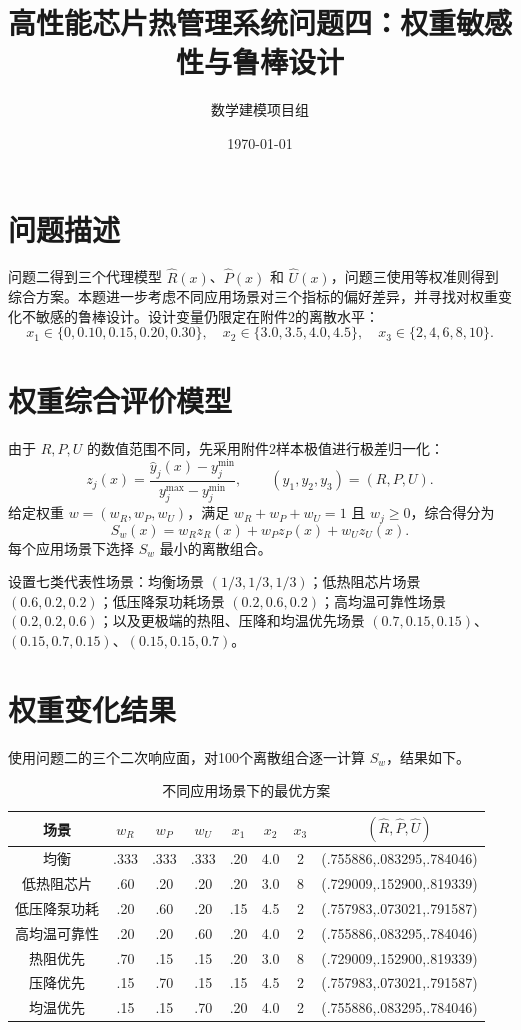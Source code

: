 \documentclass[UTF8,a4paper,12pt]{ctexart}
\title{高性能芯片热管理系统问题四：权重敏感性与鲁棒设计}
\author{数学建模项目组}\date{\today}
\begin{document}
\maketitle

\section{问题描述}
问题二得到三个代理模型 $\hat R(x)$、$\hat P(x)$ 和 $\hat U(x)$，问题三使用等权准则得到综合方案。本题进一步考虑不同应用场景对三个指标的偏好差异，并寻找对权重变化不敏感的鲁棒设计。设计变量仍限定在附件2的离散水平：
\[
x_1\in\{0,0.10,0.15,0.20,0.30\},\quad
x_2\in\{3.0,3.5,4.0,4.5\},\quad
x_3\in\{2,4,6,8,10\}.
\]

\section{权重综合评价模型}
由于 $R,P,U$ 的数值范围不同，先采用附件2样本极值进行极差归一化：
\begin{equation}
z_j(x)=\frac{\hat y_j(x)-y_j^{\min}}{y_j^{\max}-y_j^{\min}},\qquad (y_1,y_2,y_3)=(R,P,U).
\end{equation}
给定权重 $w=(w_R,w_P,w_U)$，满足 $w_R+w_P+w_U=1$ 且 $w_j\ge0$，综合得分为
\begin{equation}
S_w(x)=w_Rz_R(x)+w_Pz_P(x)+w_Uz_U(x).
\end{equation}
每个应用场景下选择 $S_w$ 最小的离散组合。

设置七类代表性场景：均衡场景 $(1/3,1/3,1/3)$；低热阻芯片场景 $(0.6,0.2,0.2)$；低压降泵功耗场景 $(0.2,0.6,0.2)$；高均温可靠性场景 $(0.2,0.2,0.6)$；以及更极端的热阻、压降和均温优先场景 $(0.7,0.15,0.15)$、$(0.15,0.7,0.15)$、$(0.15,0.15,0.7)$。

\section{权重变化结果}
使用问题二的三个二次响应面，对100个离散组合逐一计算 $S_w$，结果如下。

\begin{table}[h]\centering\caption{不同应用场景下的最优方案}
\begin{tabular}{c|ccc|ccc|c}
\toprule
场景 & $w_R$ & $w_P$ & $w_U$ & $x_1$ & $x_2$ & $x_3$ & $(\hat R,\hat P,\hat U)$\\
\midrule
均衡 & .333 & .333 & .333 & .20 & 4.0 & 2 & (.755886,.083295,.784046)\\
低热阻芯片 & .60 & .20 & .20 & .20 & 3.0 & 8 & (.729009,.152900,.819339)\\
低压降泵功耗 & .20 & .60 & .20 & .15 & 4.5 & 2 & (.757983,.073021,.791587)\\
高均温可靠性 & .20 & .20 & .60 & .20 & 4.0 & 2 & (.755886,.083295,.784046)\\
热阻优先 & .70 & .15 & .15 & .20 & 3.0 & 8 & (.729009,.152900,.819339)\\
压降优先 & .15 & .70 & .15 & .15 & 4.5 & 2 & (.757983,.073021,.791587)\\
均温优先 & .15 & .15 & .70 & .20 & 4.0 & 2 & (.755886,.083295,.784046)\\
\bottomrule
\end{tabular}
\end{table}
\end{document}
